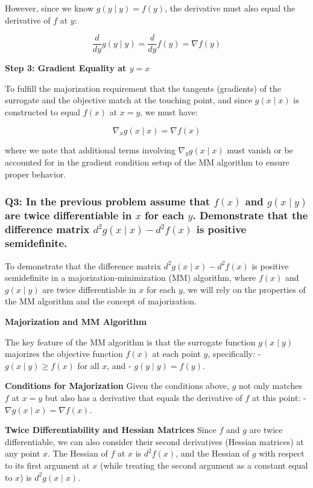 \documentclass[8pt]{article}
\begin{document}
{However, since we know \(g(y \mid y) = f(y)\), the derivative must also equal the derivative of \(f\) at \(y\):

\[
\frac{d}{dy} g(y \mid y) = \frac{d}{dy} f(y) = \nabla f(y)
\]

\textbf{Step 3: Gradient Equality at \(y = x\)}

To fulfill the majorization requirement that the tangents (gradients) of the surrogate and the objective match at the touching point, and since \(g(x \mid x)\) is constructed to equal \(f(x)\) at \(x = y\), we must have:

\[
\nabla_x g(x \mid x) = \nabla f(x)
\]

where we note that additional terms involving \(\nabla_y g(x \mid x)\) must vanish or be accounted for in the gradient condition setup of the MM algorithm to ensure proper behavior.

\subsubsection*{Q3: In the previous problem assume that \(f(x)\) and \(g(x \mid y)\) are twice differentiable in \(x\) for each \(y\). Demonstrate that the difference matrix \(d^2 g(x \mid x) - d^2 f(x)\) is positive semidefinite.}

To demonstrate that the difference matrix \(d^2 g(x \mid x) - d^2 f(x)\) is positive semidefinite in a majorization-minimization (MM) algorithm, where \(f(x)\) and \(g(x \mid y)\) are twice differentiable in \(x\) for each \(y\), we will rely on the properties of the MM algorithm and the concept of majorization.

\textbf{ Majorization and MM Algorithm}

The key feature of the MM algorithm is that the surrogate function \(g(x \mid y)\) majorizes the objective function \(f(x)\) at each point \(y\), specifically:
- \(g(x \mid y) \geq f(x)\) for all \(x\), and
- \(g(y \mid y) = f(y)\).

\textbf{Conditions for Majorization}
Given the conditions above, \(g\) not only matches \(f\) at \(x = y\) but also has a derivative that equals the derivative of \(f\) at this point:
- \(\nabla g(x \mid x) = \nabla f(x)\).

\textbf{Twice Differentiability and Hessian Matrices}
Since \(f\) and \(g\) are twice differentiable, we can also consider their second derivatives (Hessian matrices) at any point \(x\). The Hessian of \(f\) at \(x\) is \(d^2 f(x)\), and the Hessian of \(g\) with respect to its first argument at \(x\) (while treating the second argument as a constant equal to \(x\)) is \(d^2 g(x \mid x)\).

}
\end{document}
